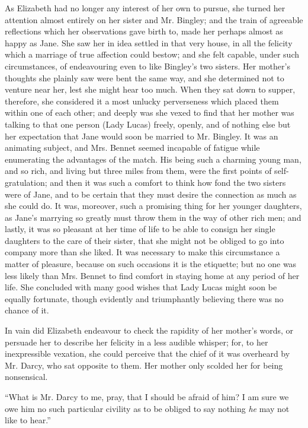 As Elizabeth had no longer any interest of her own to pursue, she turned her attention almost entirely on her sister and Mr. Bingley; and the train of agreeable reflections which her observations gave birth to, made her perhaps almost as happy as Jane. She saw her in idea settled in that very house, in all the felicity which a marriage of true affection could bestow; and she felt capable, under such circumstances, of endeavouring even to like Bingley's two sisters. Her mother's thoughts she plainly saw were bent the same way, and she determined not to venture near her, lest she might hear too much. When they sat down to supper, therefore, she considered it a most unlucky perverseness which placed them within one of each other; and deeply was she vexed to find that her mother was talking to that one person (Lady Lucas) freely, openly, and of nothing else but her expectation that Jane would soon be married to Mr. Bingley. It was an animating subject, and Mrs. Bennet seemed incapable of fatigue while enumerating the advantages of the match. His being such a charming young man, and so rich, and living but three miles from them, were the first points of self-gratulation; and then it was such a comfort to think how fond the two sisters were of Jane, and to be certain that they must desire the connection as much as she could do. It was, moreover, such a promising thing for her younger daughters, as Jane's marrying so greatly must throw them in the way of other rich men; and lastly, it was so pleasant at her time of life to be able to consign her single daughters to the care of their sister, that she might not be obliged to go into company more than she liked. It was necessary to make this circumstance a matter of pleasure, because on such occasions it is the etiquette; but no one was less likely than Mrs. Bennet to find comfort in staying home at any period of her life. She concluded with many good wishes that Lady Lucas might soon be equally fortunate, though evidently and triumphantly believing there was no chance of it.

In vain did Elizabeth endeavour to check the rapidity of her mother's words, or persuade her to describe her felicity in a less audible whisper; for, to her inexpressible vexation, she could perceive that the chief of it was overheard by Mr. Darcy, who sat opposite to them. Her mother only scolded her for being nonsensical.

“What is Mr. Darcy to me, pray, that I should be afraid of him? I am sure we owe him no such particular civility as to be obliged to say nothing {\em he} may not like to hear.”


